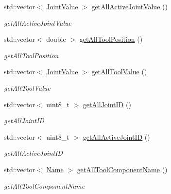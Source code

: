 \begin{DoxyCompactItemize}
std\+::vector$<$ \hyperlink{namespacerobotis__manipulator_aa0556c98c5294ccf3a96c2d0fe315e40}{Joint\+Value} $>$ \hyperlink{classrobotis__manipulator_1_1_manipulator_ae11f05005b456e13ef17585a70179dce}{get\+All\+Active\+Joint\+Value} ()
\begin{DoxyCompactList}\small\item\em get\+All\+Active\+Joint\+Value \end{DoxyCompactList}\item 
std\+::vector$<$ double $>$ \hyperlink{classrobotis__manipulator_1_1_manipulator_af3ed7fd19820970d246f4a2459151075}{get\+All\+Tool\+Position} ()
\begin{DoxyCompactList}\small\item\em get\+All\+Tool\+Position \end{DoxyCompactList}\item 
std\+::vector$<$ \hyperlink{namespacerobotis__manipulator_aa0556c98c5294ccf3a96c2d0fe315e40}{Joint\+Value} $>$ \hyperlink{classrobotis__manipulator_1_1_manipulator_a996f60dc81526d473a3e5223d58979c7}{get\+All\+Tool\+Value} ()
\begin{DoxyCompactList}\small\item\em get\+All\+Tool\+Value \end{DoxyCompactList}\item 
std\+::vector$<$ uint8\+\_\+t $>$ \hyperlink{classrobotis__manipulator_1_1_manipulator_a689daa284722f6b940e1196dd3dde43e}{get\+All\+Joint\+ID} ()
\begin{DoxyCompactList}\small\item\em get\+All\+Joint\+ID \end{DoxyCompactList}\item 
std\+::vector$<$ uint8\+\_\+t $>$ \hyperlink{classrobotis__manipulator_1_1_manipulator_a36d90688599cbd3067ce1d0c07f514aa}{get\+All\+Active\+Joint\+ID} ()
\begin{DoxyCompactList}\small\item\em get\+All\+Active\+Joint\+ID \end{DoxyCompactList}\item 
std\+::vector$<$ \hyperlink{namespacerobotis__manipulator_a08c2d25e77a01ad75b9bb740f8ce4765}{Name} $>$ \hyperlink{classrobotis__manipulator_1_1_manipulator_a53cf6f3195057072869795ebac3b8dce}{get\+All\+Tool\+Component\+Name} ()
\begin{DoxyCompactList}\small\item\em get\+All\+Tool\+Component\+Name \end{DoxyCompactList}\item 

\end{DoxyCompactItemize}
